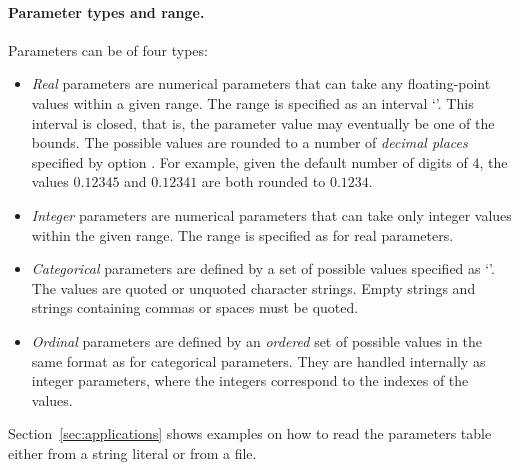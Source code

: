 \documentclass[article,a4paper,nojss,notitle]{jss}
\newcommand{\parameter}[1]{\code{#1}}
\begin{document}
\paragraph{Parameter types and range.}
Parameters can be of four types:
%
\begin{itemize}
\item \textit{Real} parameters are numerical parameters that can take
  any floating-point values within a given range. The range is
  specified as an interval `'. This interval is closed, that is, the parameter value
  may eventually be one of the bounds. The possible values are rounded
  to a number of \emph{decimal places} specified by
  option \parameter{digits}. For example, given the default
  number of digits of $4$, the values $0.12345$ and
  $0.12341$ are both rounded to $0.1234$.

\item \textit{Integer} parameters are numerical parameters that can
  take only integer values within the given range. The range is
  specified as for real parameters.

\item \textit{Categorical} parameters are defined by a set of possible
  values specified as `'. The values
  are quoted or unquoted character strings. Empty strings and strings
  containing commas or spaces must be quoted.

\item \emph{Ordinal} parameters are defined by an \emph{ordered} set
  of possible values in the same format as for categorical
  parameters. They are handled internally as integer parameters, where
  the integers correspond to the indexes of the values.

\end{itemize}

Section~\ref{sec:applications} shows examples on how to read the
parameters table either from a string literal or from a file.

\end{document}
